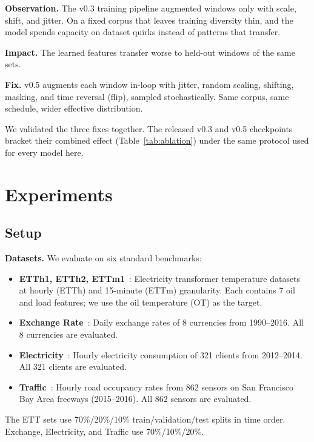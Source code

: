\documentclass[11pt]{article}
\begin{document}
\textbf{Observation.} The v0.3 training pipeline augmented windows only with scale, shift, and jitter. On a fixed corpus that leaves training diversity thin, and the model spends capacity on dataset quirks instead of patterns that transfer.

\textbf{Impact.} The learned features transfer worse to held-out windows of the same sets.

\textbf{Fix.} v0.5 augments each window in-loop with jitter, random scaling, shifting, masking, and time reversal (flip), sampled stochastically. Same corpus, same schedule, wider effective distribution.

We validated the three fixes together. The released v0.3 and v0.5 checkpoints bracket their combined effect (Table~\ref{tab:ablation}) under the same protocol used for every model here.

\section{Experiments}
\label{sec:experiments}

\subsection{Setup}
\label{sec:setup}

\textbf{Datasets.} We evaluate on six standard benchmarks:

\begin{itemize}
\item \textbf{ETTh1, ETTh2, ETTm1}~\cite{ett}: Electricity transformer temperature datasets at hourly (ETTh) and 15-minute (ETTm) granularity. Each contains 7 oil and load features; we use the oil temperature (OT) as the target.
\item \textbf{Exchange Rate}~\cite{exchange}: Daily exchange rates of 8 currencies from 1990--2016. All 8 currencies are evaluated.
\item \textbf{Electricity}~\cite{electricity}: Hourly electricity consumption of 321 clients from 2012--2014. All 321 clients are evaluated.
\item \textbf{Traffic}~\cite{traffic}: Hourly road occupancy rates from 862 sensors on San Francisco Bay Area freeways (2015--2016). All 862 sensors are evaluated.
\end{itemize}

The ETT sets use 70\%/20\%/10\% train/validation/test splits in time order. Exchange, Electricity, and Traffic use 70\%/10\%/20\%.
\end{document}
